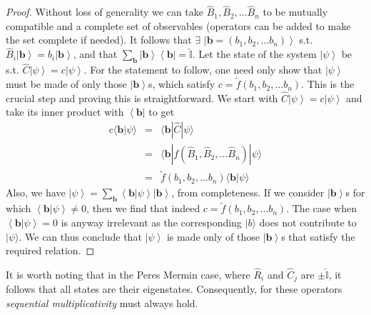 \documentclass[british,aps,prl,superscriptaddress,nofootinbib,times,reprint]{revtex4-1}
\theoremstyle{plain}
\theoremstyle{plain}
\theoremstyle{definition}
\theoremstyle{remark}
\theoremstyle{remark}
\theoremstyle{remark}
\theoremstyle{plain}
\theoremstyle{plain}
\theoremstyle{plain}
\theoremstyle{definition}
\theoremstyle{definition}
\begin{document}
\begin{proof} 
Without loss of generality we can take
$\hat{B}_{1},\hat{B}_{2},\dots\hat{B}_{n}$ to be
mutually compatible and a complete set of
observables (operators can be added to make the set
complete if needed).
It follows
that $\exists$
$\left|\mathbf{b}=\left(b_{1},b_{2},\dots
b_{n}\right)\right\rangle $ s.t.
$\hat{B}_{i}\left|\mathbf{b}\right\rangle
=b_{i}\left|\mathbf{b}\right\rangle $,
and that
$\sum_{\mathbf{b}}\left|\mathbf{b}\right\rangle
\left\langle \mathbf{b}\right|=\hat{\mathbb{I}}$.
Let the state of the system
$\left|\psi\right\rangle $ be s.t.
$\hat{C}\left|\psi\right\rangle
=c\left|\psi\right\rangle $. For
the statement to follow, one need only show that
$\left|\psi\right\rangle $ must be made of only
those $\left|\mathbf{b}\right\rangle $s, which
satisfy $c=\tilde
f(b_{1},b_{2},\dots
b_{n})$.  This is the crucial step and
proving this is straightforward. We start with
$\hat{C}\left|\psi\right\rangle
=c\left|\psi\right\rangle $ and take its inner
product with $\left\langle \mathbf{b}\right|$ to
get 
\begin{eqnarray*} 
c \langle \mathbf{b}|\psi\rangle 
& = &
\langle
\mathbf{b} |\hat{C} |\psi
\rangle  
\\
&=&
\langle
\mathbf{b}| f(\hat{B}_{1},\hat{B}_{2},\dots\hat{B}_{n}) |
\psi \rangle
\\ 
&=&
\tilde f (b_{1},b_{2},\dots b_{n})
\langle
\mathbf{b}|\psi\rangle  
\end{eqnarray*}
Also, we have $\left|\psi\right\rangle
=\sum_{\mathbf{b}}\left\langle
\mathbf{b}|\psi\right\rangle
\left|\mathbf{b}\right\rangle $, from
completeness. If we consider
$\left|\mathbf{b}\right\rangle $s for which
$\left\langle \mathbf{b}|\psi\right\rangle \neq0$,
then we find that indeed $c=\tilde
f(b_{1},b_{2},\dots
b_{n})$. The case when $\left\langle
\mathbf{b}|\psi\right\rangle =0$ is anyway
irrelevant as the corresponding $\vert b\rangle$
does not contribute to $\vert \psi\rangle$.
We can thus conclude that
$\left|\psi\right\rangle $ is made only of those
$\left|\mathbf{b}\right\rangle $s that satisfy the
required relation.
\end{proof} 
It is worth noting that in the Peres Mermin
case, where $\hat{R}_{i}$ and $\hat{C}_{j}$ are
$\pm\hat{\mathbb{I}}$, it follows that all
states are their eigenstates. Consequently, for
these operators \emph{sequential multiplicativity}
must always hold.
\end{document}
